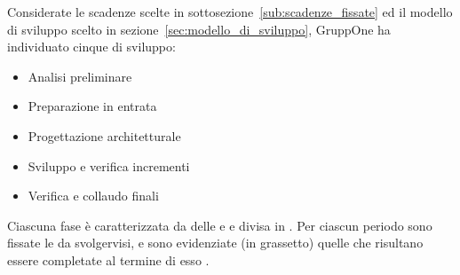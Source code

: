 \documentclass[../piano-di-progetto.tex]{subfiles}
\begin{document}
Considerate le scadenze scelte in sottosezione~\ref{sub:scadenze_fissate} ed il modello di sviluppo scelto in sezione~\ref{sec:modello_di_sviluppo}, GruppOne ha individuato cinque  di sviluppo:
\begin{itemize}
  \item Analisi preliminare
  \item Preparazione in entrata
  \item Progettazione architetturale
  \item Sviluppo e verifica incrementi
  \item Verifica e collaudo finali
\end{itemize}
Ciascuna fase è caratterizzata da delle  e  e divisa in .
Per ciascun periodo sono fissate le  da svolgervisi, e sono evidenziate (in grassetto) quelle che risultano essere completate al termine di esso .
\end{document}
